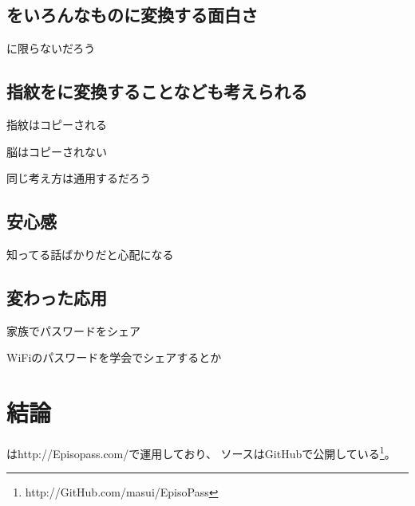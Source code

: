 \documentclass[twoside]{wiss}
\begin{document}
\subsection{{\EM}をいろんなものに変換する面白さ}

{\PW}に限らないだろう

\subsection{指紋を{\PW}に変換することなども考えられる}

指紋はコピーされる

脳はコピーされない

同じ考え方は通用するだろう

\subsection{安心感}

知ってる話ばかりだと心配になる

\subsection{変わった応用}

家族でパスワードをシェア

WiFiのパスワードを学会でシェアするとか

\section{結論}

{\EP}は\textsf{http://Episopass.com/}で運用しており、
ソースはGitHubで公開している\footnote{
  \textsf{http://GitHub.com/masui/EpisoPass}
}。



\end{document}

